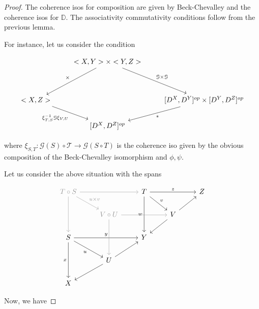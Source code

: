 \documentclass[10pt, oneside]{article}
\begin{document}
\begin{proof}
    The coherence isos for composition are given by Beck-Chevalley and the coherence isos for $\mathbb{D}$. The associativity commutativity conditions follow from the previous lemma.

    For instance, let us consider the condition

        \[\begin{tikzcd}
	& {<X, Y> \times <Y, Z>} \\
	\\
	{<X, Z>} && {[D^X, D^Y]^{op} \times [D^Y, D^Z]^{op}} \\
	& {[D^X, D^Z]^{op}}
	\arrow["{\mathcal{G} \times \mathcal{G}}", from=1-2, to=3-3]
	\arrow["\times"', from=1-2, to=3-1]
	\arrow["\ast", from=3-3, to=4-2]
	\arrow["{ \xi_{T, S}^{-1} \mathcal{G} \xi_{V, U}}"', from=3-1, to=4-2]
    \end{tikzcd}\]

\noindent where $\xi_{S, T}: \mathcal{G}(S) \circ \mathcal{T} \to \mathcal{G}(S \circ T)$ is the coherence iso given by the obvious composition of the Beck-Chevalley isomorphism and $\phi, \psi$.

Let us consider the above situation with the spans

\[\begin{tikzcd}
	\textcolor{rgb,255:red,153;green,153;blue,153}{T \circ S} && T && Z \\
	& \textcolor{rgb,255:red,153;green,153;blue,153}{V \circ U} && V \\
	S && Y \\
	& U \\
	X
	\arrow["y", from=3-1, to=3-3]
	\arrow["w"', from=1-3, to=3-3]
	\arrow["v", from=1-3, to=2-4]
	\arrow[from=2-4, to=3-3]
	\arrow["z", from=1-3, to=1-5]
	\arrow[from=2-4, to=1-5]
	\arrow[from=4-2, to=3-3]
	\arrow[from=4-2, to=5-1]
	\arrow["x"', from=3-1, to=5-1]
	\arrow["u"', from=3-1, to=4-2]
	\arrow[color={rgb,255:red,153;green,153;blue,153}, from=2-2, to=4-2]
	\arrow["{u \times v}", color={rgb,255:red,153;green,153;blue,153}, from=1-1, to=2-2]
	\arrow[color={rgb,255:red,153;green,153;blue,153}, from=2-2, to=2-4]
	\arrow[color={rgb,255:red,153;green,153;blue,153}, from=1-1, to=3-1]
	\arrow[color={rgb,255:red,153;green,153;blue,153}, from=1-1, to=1-3]
\end{tikzcd}\]

Now, we have


\end{proof}
\end{document}
